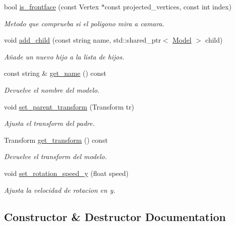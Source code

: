 \begin{DoxyCompactItemize}
bool \mbox{\hyperlink{classexample_1_1_model_a576801ca87f261183fa0b0720114fa04}{is\+\_\+frontface}} (const Vertex $\ast$const projected\+\_\+vertices, const int index)
\begin{DoxyCompactList}\small\item\em Metodo que comprueba si el poligono mira a camara. \end{DoxyCompactList}\item 
void \mbox{\hyperlink{classexample_1_1_model_a521e2eff6ac59ccd7d816e014f846600}{add\+\_\+child}} (const string name, std\+::shared\+\_\+ptr$<$ \mbox{\hyperlink{classexample_1_1_model}{Model}} $>$ child)
\begin{DoxyCompactList}\small\item\em Añade un nuevo hijo a la lista de hijos. \end{DoxyCompactList}\item 
const string \& \mbox{\hyperlink{classexample_1_1_model_aaeab3d2650177e97847b11684c7575f4}{get\+\_\+name}} () const
\begin{DoxyCompactList}\small\item\em Devuelve el nombre del modelo. \end{DoxyCompactList}\item 
void \mbox{\hyperlink{classexample_1_1_model_a965eaf2f978ae6703ee30d61c0d9174d}{set\+\_\+parent\+\_\+transform}} (Transform tr)
\begin{DoxyCompactList}\small\item\em Ajusta el transform del padre. \end{DoxyCompactList}\item 
Transform \mbox{\hyperlink{classexample_1_1_model_a18630b95037b7e762d87059f5264e83c}{get\+\_\+transform}} () const
\begin{DoxyCompactList}\small\item\em Devuelve el transform del modelo. \end{DoxyCompactList}\item 
void \mbox{\hyperlink{classexample_1_1_model_a81c93ba8b5c79f79e4f33a3bf826c0ae}{set\+\_\+rotation\+\_\+speed\+\_\+y}} (float speed)
\begin{DoxyCompactList}\small\item\em Ajusta la velocidad de rotacion en y. \end{DoxyCompactList}\end{DoxyCompactItemize}


\subsection{Constructor \& Destructor Documentation}
\mbox{\label{classexample_1_1_model_a6fa0e02fdbf149f9058075fa75175416}} 
